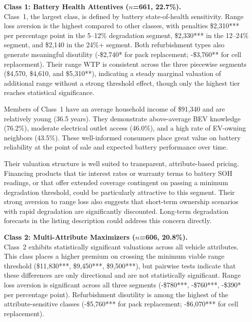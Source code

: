 \documentclass[a4paper,fleqn]{cas-sc}   %
\begin{document}
\noindent\textbf{Class 1: Battery Health Attentives ($n$=661, 22.7\%).}\\
Class~1, the largest class, is defined by battery state-of-health sensitivity. Range loss aversion is the highest compared to other classes, with penalties \$2,310*** per percentage point in the 5--12\% degradation segment, \$2,330*** in the 12--24\% segment, and \$2,140 in the 24\%+ segment. Both refurbishment types also generate meaningful disutility (-\$2,740* for pack replacement; -\$3,760** for cell replacement). Their range WTP is consistent across the three piecewise segments (\$4,570, \$4,610, and \$5,310**), indicating a steady marginal valuation of additional range without a strong threshold effect, though only the highest tier reaches statistical significance.

Members of Class~1 have an average household income of \$91,340 and are relatively young (36.5 years). They demonstrate above-average BEV knowledge (76.2\%), moderate electrical outlet access (46.0\%), and a high rate of EV-owning neighbors (43.5\%). These well-informed consumers place great value on battery reliability at the point of sale and expected battery performance over time.

Their valuation structure is well suited to transparent, attribute-based pricing. Financing products that tie interest rates or warranty terms to battery SOH readings, or that offer extended coverage contingent on passing a minimum degradation threshold, could be particularly attractive to this segment. Their strong aversion to range loss also suggests that short-term ownership scenarios with rapid degradation are significantly discounted. Long-term degradation forecasts in the listing description could address this concern directly.

\medskip

\noindent\textbf{Class 2: Multi-Attribute Maximizers ($n$=606, 20.8\%).}\\
Class~2 exhibits statistically significant valuations across all vehicle attributes. This class places a higher premium on crossing the minimum viable range threshold (\$11,830***, \$9,450***, \$9,500***), but pairwise tests indicate that these differences are only directional and are not statistically significant. Range loss aversion is significant across all three segments (-\$780***, -\$760***, -\$390* per percentage point). Refurbishment disutility is among the highest of the attribute-sensitive classes (-\$5,760*** for pack replacement; -\$6,070*** for cell replacement).
\end{document}
